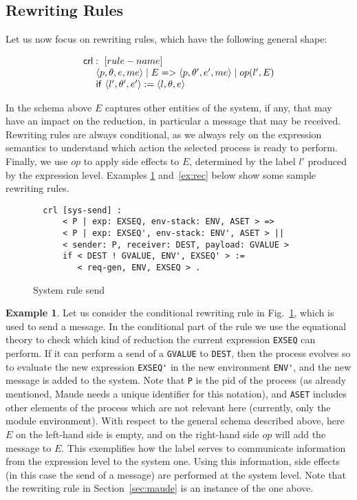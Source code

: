 \documentclass{article}[12pt,a4paper]
\theoremstyle{definition}
\newtheorem{example}{Example}[section]
\newcommand{\paral}{\;|\;}
\begin{document}
\subsection{Rewriting Rules}
Let us now focus on rewriting rules, which have the following general shape:

\[
  \begin{array}{l}
    \ms{crl}:~[rule-name]\\
    ~~~~\langle p, \theta, e, me \rangle \paral E => \langle p,\theta', e', me \rangle \paral op(l', E)\\
    ~~~~\ms{if}~\langle l', \theta', e'\rangle := \langle l,\theta,e\rangle
  \end{array}
\]

In the schema above $E$ captures other entities of the system, if any,
that may have an impact on the reduction, in particular a message that
may be received.  Rewriting rules are always conditional, as we always
rely on the expression semantics to understand which action the
selected process is ready to perform. Finally, we use $op$ to apply
side effects to $E$, determined by the label $l'$ produced by the
expression level. Examples \ref{ex:send} and~\ref{ex:rec} below show
some sample rewriting rules.

\begin{figure}[t]
  \centering
\begin{verbatim}
  crl [sys-send] :
      < P | exp: EXSEQ, env-stack: ENV, ASET > =>
      < P | exp: EXSEQ', env-stack: ENV', ASET > ||
      < sender: P, receiver: DEST, payload: GVALUE >
      if < DEST ! GVALUE, ENV', EXSEQ' > :=
         < req-gen, ENV, EXSEQ > .
\end{verbatim}
  \caption{System rule send}
  \label{fig:rule-send}
\end{figure}

\begin{example}\label{ex:send}
  Let us consider the conditional rewriting rule in Fig.~\ref{fig:rule-send}, which is used to send a message. In the conditional part of the
  rule we use the equational theory to check which kind of reduction the current expression \verb+EXSEQ+ can perform. If it can perform a send of a \verb+GVALUE+ to \verb+DEST+, then the process evolves so to evaluate the new expression \verb+EXSEQ'+ in the new environment \verb+ENV'+, and the new message is added to the system. Note that \verb+P+ is the pid of the process (as already mentioned, Maude needs a unique identifier for this notation), and \verb+ASET+ includes other elements of the process which are not relevant here (currently, only the module environment).
  With respect to the general schema described above, here $E$ on the left-hand side is empty, and
  on the right-hand side $op$ will add the message to $E$.
  This exemplifies how the label serves to communicate information from the
  expression level to the system one. Using this information, side effects (in this case the send of a message) are performed at the system level. Note that the rewriting rule in Section~\ref{sec:maude} is an instance of the one above.
\end{example}
\end{document}
